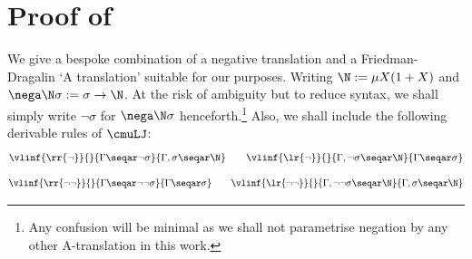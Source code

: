 \section{Proof of~}\label{app:proofs-of-sec-circular-mulj}
% 
\label{subsec:proofs-of-cmulj-into-cmuljminus}



We give a bespoke combination of a negative translation and a Friedman-Dragalin `A translation' suitable for our purposes.
Writing $\N:= \mu X (1+X)$ and $\nega \N \sigma := \sigma \to \N$.
At the risk of ambiguity but to reduce syntax, we shall simply write $\neg \sigma$ for $\nega \N \sigma$ henceforth.\footnote{
Any confusion will be minimal as we shall not parametrise negation by any other A-translation in this work.} Also, we shall include the following derivable rules of $\cmuLJ$:
    \begin{equation}\label{eqn:negation-rules}
         \vlinf{\rr{\neg} }{}{\Gamma \seqar  \neg \sigma}{\Gamma, \sigma \seqar \N} 
 \qquad 
 \vlinf{\lr{\neg}}{}{\Gamma, \neg \sigma \seqar \N}{\Gamma \seqar \sigma}
    \end{equation}
\[
     \vlinf{\rr{\neg \neg} }{}{\Gamma \seqar \neg \neg \sigma}{\Gamma \seqar \sigma}   
     \qquad 
     \vlinf{\lr {\neg \neg }}{}{\Gamma, \neg\neg \sigma \seqar \N}{\Gamma, \sigma \seqar \N }
\]


